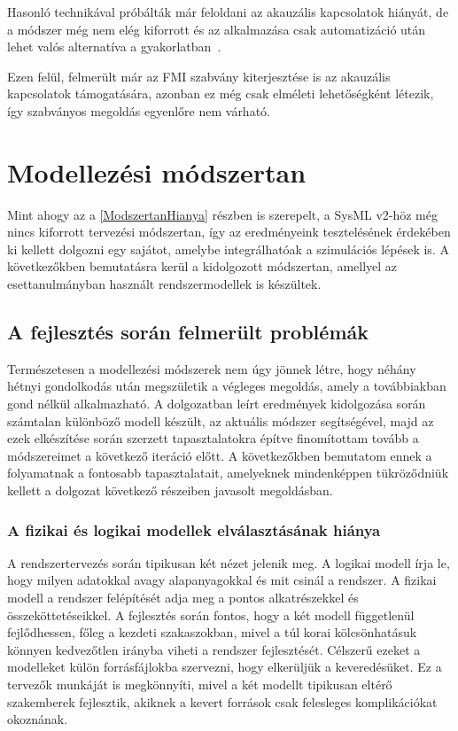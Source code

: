         Hasonló technikával próbálták már feloldani az akauzális kapcsolatok hiányát, de a módszer még nem elég kiforrott és az alkalmazása csak automatizáció után lehet valós alternatíva a gyakorlatban~\cite{Hirano_2015, Fish2023}.
        
        Ezen felül, felmerült már az FMI szabvány kiterjesztése is az akauzális kapcsolatok támogatására, azonban ez még csak elméleti lehetőségként létezik, így szabványos megoldás egyenlőre nem várható.

\section{Modellezési módszertan}
Mint ahogy az a \ref{ModszertanHianya} részben is szerepelt, a SysML v2-höz még nincs kiforrott tervezési módszertan, így az eredményeink tesztelésének érdekében ki kellett dolgozni egy sajátot, amelybe integrálhatóak a szimulációs lépések is.
A következőkben bemutatásra kerül a kidolgozott módszertan, amellyel az esettanulmányban használt rendszermodellek is készültek.
    
    \subsection{A fejlesztés során felmerült problémák} \label{ProblemsToSolve}
    Természetesen a modellezési módszerek nem úgy jönnek létre, hogy néhány hétnyi gondolkodás után megszületik a végleges megoldás, amely a továbbiakban gond nélkül alkalmazható.
    A dolgozatban leírt eredmények kidolgozása során számtalan különböző modell készült, az aktuális módszer segítségével, majd az ezek elkészítése során szerzett tapasztalatokra építve finomítottam tovább a módszereimet a következő iteráció előtt.
    A következőkben bemutatom ennek a folyamatnak a fontosabb tapasztalatait, amelyeknek mindenképpen tükröződniük kellett a dolgozat következő részeiben javasolt megoldásban.

        \subsubsection{A fizikai és logikai modellek elválasztásának hiánya} \label{sec:LogFiz}
        A rendszertervezés során tipikusan két nézet jelenik meg. A logikai modell írja le, hogy milyen adatokkal avagy alapanyagokkal és mit csinál a rendszer.
        A fizikai modell a rendszer felépítését adja meg a pontos alkatrészekkel és összeköttetéseikkel.
        A fejlesztés során fontos, hogy a két modell függetlenül fejlődhessen, főleg a kezdeti szakaszokban, mivel a túl korai kölcsönhatásuk könnyen kedvezőtlen irányba viheti a rendszer fejlesztését.
        Célszerű ezeket a modelleket külön forrásfájlokba szervezni, hogy elkerüljük a keveredésüket.
        Ez a tervezők munkáját is megkönnyíti, mivel a két modellt tipikusan eltérő szakemberek fejlesztik, akiknek a kevert források csak felesleges komplikációkat okoznának.
        
